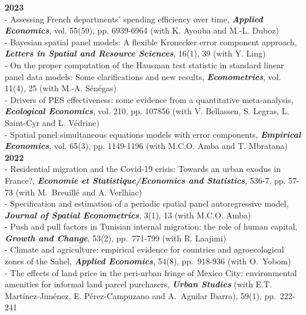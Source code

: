 \documentclass[a4paper,12pt]{article}
\begin{document}
\noindent \textbf{2023}  \smallskip \\ 
- Assessing French departments' spending efficiency over time, \textit{\textbf{Applied Economics}}, vol. 55(59), pp. 6939-6964 (with K. Ayouba and M.-L. Duboz) \\
- Bayesian spatial panel models: A flexible Kronecker error component approach, \textit{\textbf{Letters in Spatial and Resource Sciences}}, 16(1), 39 (with Y. Ling) \\
- On the proper computation of the Hausman test statistic in standard linear panel data models: Some clarifications and new results, \textit{\textbf{Econometrics}}, vol. 11(4), 25 (with M.-A. Sénégas)\\
- Drivers of PES effectiveness: some evidence from a quantitative meta-analysis, \textit{\textbf{Ecological Economics}}, vol. 210, pp. 107856 (with V. Bellassen, S. Legras, L. Saint-Cyr and L. Védrine) \\
- Spatial panel simultaneous equations models with error components, \textit{\textbf{Empirical Economics}}, vol. 65(3), pp. 1149-1196 (with M.C.O. Amba and T. Mbratana) \\

\noindent \textbf{2022}  \smallskip \\ 
- Residential migration and the Covid-19 crisis: Towards an urban exodus in France?,  \textit{\textbf{Economie et Statistique/Economics and Statistics}}, 536-7, pp. 57-73 (with M.~Breuillé and A. Verlhiac) \\
- Specification and estimation of a periodic spatial panel autoregressive model, \textit{\textbf{Journal of Spatial Econometrics}}, 3(1), 13 (with M.C.O. Amba)  \\ 
- Push and pull factors in Tunisian internal migration: the role of human capital, \textit{\textbf{Growth and Change}}, 53(2), pp.~771-799  (with R. Laajimi) \\ 
- Climate and agriculture: empirical evidence for countries and agroecological zones of the Sahel, \textit{\textbf{Applied Economics}}, 54(8), pp.~918-936 (with O.~Yobom)\\
- The effects of land price in the peri-urban fringe of Mexico City: environmental amenities for informal land parcel purchasers, \textit{\textbf{Urban Studies}} (with E.T. Martínez-Jiménez, E. Pérez-Campuzano and A.~Aguilar Ibarra), 59(1), pp.~222-241 \\	
\end{document}
